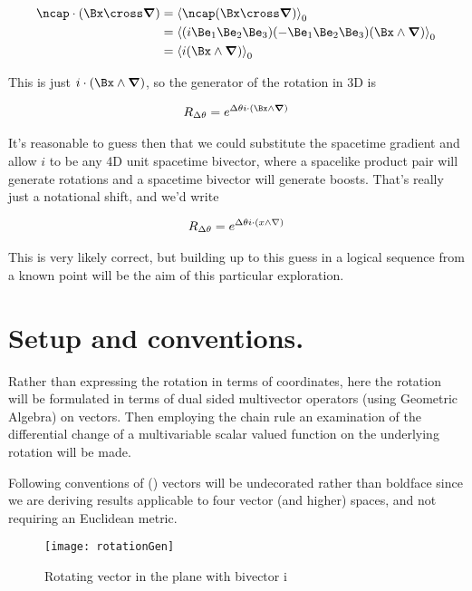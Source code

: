 \begin{align*}
\ncap \cdot (\Bx \cross \spacegrad) 
&=
\gpgradezero{ \ncap (\Bx \cross \spacegrad) } \\
&=
\gpgradezero{ (i \Be_1 \Be_2 \Be_3) (-\Be_1 \Be_2 \Be_3) (\Bx \wedge \spacegrad) } \\
&=
\gpgradezero{ i (\Bx \wedge \spacegrad) } \\
\end{align*}

This is just $i \cdot (\Bx \wedge \spacegrad)$, so the generator of the rotation in 3D is

\begin{align}\label{eqn:rotationGen:goo4}
R_{\Delta\theta} = e^{\Delta\theta i \cdot (\Bx \wedge \spacegrad)}
\end{align}

It's reasonable to guess then that we could substitute the spacetime gradient and allow $i$ to be any 4D unit spacetime bivector, where a spacelike product pair will generate rotations and a spacetime bivector will generate boosts.  That's really just a notational shift, and we'd write

\begin{align}\label{eqn:rotationGen:goo5}
R_{\Delta\theta} = e^{\Delta\theta i \cdot (x \wedge \nabla)}
\end{align}

This is very likely correct, but building up to this guess in a logical sequence from a known point will be the aim of this particular exploration.

\section{Setup and conventions.}

Rather than expressing the rotation in terms of coordinates, here the rotation will be formulated in terms of dual sided multivector operators (using Geometric Algebra) on vectors.  Then employing the chain rule an examination of the differential change of a multivariable scalar valued function on the underlying rotation will be made.

Following conventions of (\cite{doran2003gap}) vectors will be undecorated rather than boldface since we are deriving results applicable to four vector (and higher) spaces, and not requiring an Euclidean metric.

\begin{figure}[htp]
\centering
\texttt{[image: rotationGen]}
\caption{Rotating vector in the plane with bivector i}\label{fig:rotationGen:rotationGen}
\end{figure}


